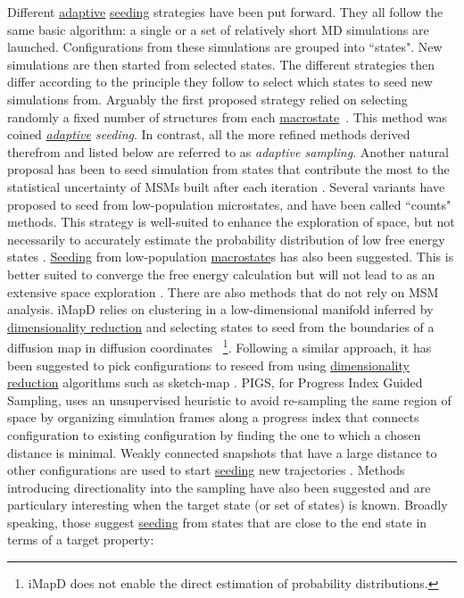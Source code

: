 \documentclass[9pt,review]{livecoms}
\begin{document}
Different \hyperlink{ref:Adaptive} {adaptive} \hyperlink{ref:Seeding} {seeding} strategies have been put forward. They all follow the same basic algorithm: a single or a set of relatively short MD simulations are launched. Configurations from these simulations are grouped into ``states". New simulations are then started from selected states. The different strategies then differ according to the principle they follow to select which states to seed new simulations from.
Arguably the first proposed strategy relied on selecting randomly a fixed number of structures from each \hyperlink{ref:Macrostate} {macrostate}~\cite{doi:10.1063/1.2740261,Huang19765,doi:10.1021/ct900620b}. This method was coined \emph{\hyperlink{ref:Adaptive} {adaptive} seeding}. In contrast, all the more refined methods derived therefrom and listed below are referred to as \emph{adaptive sampling}. Another natural proposal has been to seed simulation from states that contribute the most to the statistical uncertainty of MSMs built after each iteration \cite{doi:10.1021/ct500827g}. Several variants have proposed to seed from low-population microstates, and have been called ``counts" methods. This strategy is well-suited to enhance the exploration of space, but not necessarily to accurately estimate the probability distribution of low free energy states \cite{doi:10.1021/ct2004484,doi:10.1021/ct400919u,lecina_adaptive_2017,shamsi_enhanced_2017,6114444}. \hyperlink{ref:Seeding} {Seeding} from low-population \hyperlink{ref:Macrostate} {macrostate}s has also been suggested. This is better suited to converge the free energy calculation but will not lead to as an extensive space exploration \cite{doi:10.1021/acs.jctc.6b00762,doi:10.1063/1.5053582}. There are also methods that do not rely on MSM analysis. iMapD relies on clustering in a low-dimensional manifold inferred by \hyperlink{ref:DimRed} {dimensionality reduction} and selecting states to seed from the boundaries of a diffusion map in diffusion coordinates \cite{ChiavazzoE5494}~\footnote{iMapD does not enable the direct estimation of probability distributions.}. Following a similar approach, it has been suggested to pick configurations to reseed from using \hyperlink{ref:DimRed} {dimensionality reduction} algorithms such as sketch-map \cite{doi:10.1021/acs.jctc.6b00503}. PIGS, for Progress Index Guided Sampling, uses an unsupervised heuristic to avoid re-sampling the same region of space by organizing simulation frames along a progress index that connects configuration to existing configuration by finding the one to which a chosen distance is minimal. Weakly connected snapshots that have a large distance to other configurations are used to start \hyperlink{ref:Seeding} {seeding} new trajectories \cite{BACCI2015889}. Methods introducing directionality into the sampling have also been suggested and are particulary interesting when the target state (or set of states) is known. Broadly speaking, those suggest \hyperlink{ref:Seeding} {seeding} from states that are close to the end state in terms of a target property:
\end{document}
